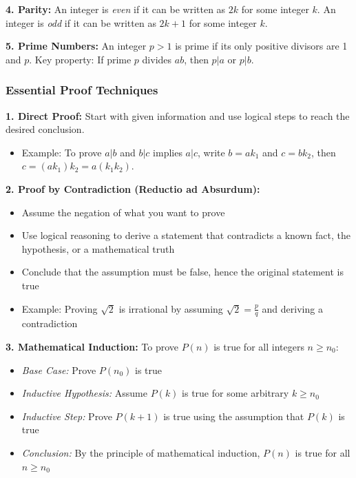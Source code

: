 \documentclass[12pt]{article}
\begin{document}
\textbf{4. Parity:} An integer is \textit{even} if it can be written as $2k$ for some integer $k$. An integer is \textit{odd} if it can be written as $2k+1$ for some integer $k$.

\textbf{5. Prime Numbers:} An integer $p > 1$ is prime if its only positive divisors are 1 and $p$. Key property: If prime $p$ divides $ab$, then $p | a$ or $p | b$.

\subsubsection*{Essential Proof Techniques}

\textbf{1. Direct Proof:} Start with given information and use logical steps to reach the desired conclusion.
\begin{itemize}
    \item Example: To prove $a | b$ and $b | c$ implies $a | c$, write $b = ak_1$ and $c = bk_2$, then $c = (ak_1)k_2 = a(k_1k_2)$.
\end{itemize}

\textbf{2. Proof by Contradiction (Reductio ad Absurdum):}
\begin{itemize}
    \item Assume the negation of what you want to prove
    \item Use logical reasoning to derive a statement that contradicts a known fact, the hypothesis, or a mathematical truth
    \item Conclude that the assumption must be false, hence the original statement is true
    \item Example: Proving $\sqrt{2}$ is irrational by assuming $\sqrt{2} = \frac{p}{q}$ and deriving a contradiction
\end{itemize}

\textbf{3. Mathematical Induction:} To prove $P(n)$ is true for all integers $n \geq n_0$:
\begin{itemize}
    \item \textit{Base Case:} Prove $P(n_0)$ is true
    \item \textit{Inductive Hypothesis:} Assume $P(k)$ is true for some arbitrary $k \geq n_0$
    \item \textit{Inductive Step:} Prove $P(k+1)$ is true using the assumption that $P(k)$ is true
    \item \textit{Conclusion:} By the principle of mathematical induction, $P(n)$ is true for all $n \geq n_0$
\end{itemize}
\end{document}
